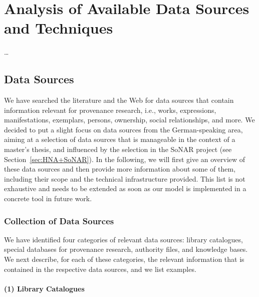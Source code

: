 \chapter{Analysis of Available Data Sources and Techniques}
\label{chap:analysis}

\dots


\section{Data Sources}
\label{sec:data_sources}

We have searched the literature and the Web for data sources that contain information
relevant for provenance research, i.e., works, expressions, manifestations, exemplars,
persons, ownership, social relationships, and more. 
We decided to put a slight focus on data sources from the German-speaking area, 
aiming at a selection of data sources that is manageable in the context of a master's thesis,
and influenced by the selection in the \gls{SoNAR} project (see Section~\ref{sec:HNA+SoNAR}).
In the following, we will first give an overview of these data sources
and then provide more information about some of them,
including their scope and the technical infrastructure provided.
This list is not exhaustive and needs to be extended
as soon as our model is implemented in a concrete tool in future work.

\subsection{Collection of Data Sources}

We have identified four categories of relevant data sources:
library catalogues, special databases for provenance research, authority files, and knowledge bases.
We next describe, for each of these categories, the relevant information that is
contained in the respective data sources, and we list examples.

\subsubsection{(1) Library Catalogues}

